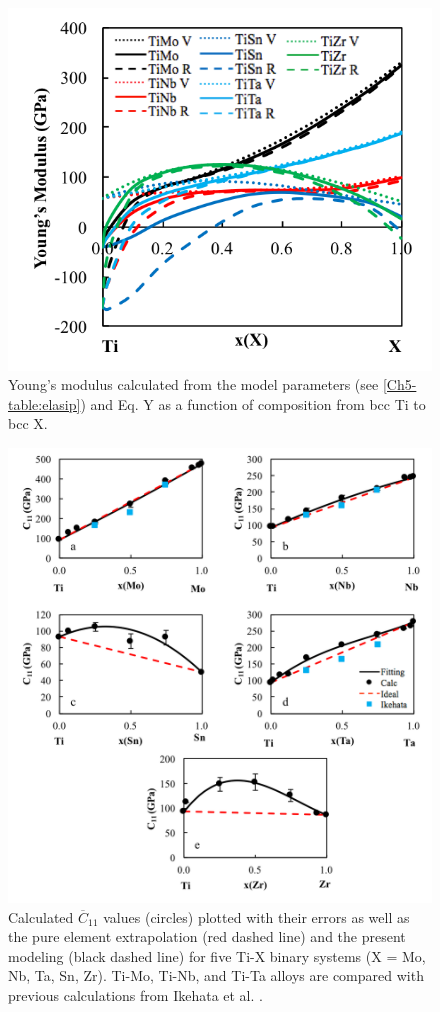 \pagebreak
\begin{figure}[H]
	\centering
	\includegraphics[width=\textwidth]{Chapter-5/Figures/emap.png}
	\caption{Young's modulus calculated from the model parameters (see \ref{Ch5-table:elasip}) and Eq. Y as a function of composition from bcc Ti to bcc X.}
	\label{Ch5-figure:tixmap}
\end{figure}

\pagebreak
\begin{figure}[H]
	\centering
	\includegraphics[width=\textwidth]{Chapter-5/Figures/tixc11.png}
	\caption{Calculated $\overline{C}_{11}$ values (circles) plotted with their errors as well as the pure element extrapolation (red dashed line) and the present modeling (black dashed line) for five Ti-X binary systems (X = Mo, Nb, Ta, Sn, Zr). Ti-Mo, Ti-Nb, and Ti-Ta alloys are compared with previous calculations from Ikehata et al. \cite{Ikehata2004}.}
	\label{Ch5-figure:tixc11}
\end{figure}

